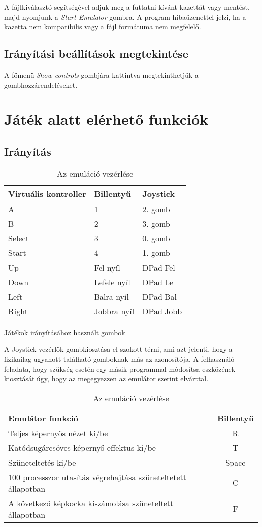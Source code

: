 A fájlkiválasztó segítségével adjuk meg a futtatni kívánt kazettát vagy mentést, majd nyomjunk a \emph{Start Emulator} gombra.
A program hibaüzenettel jelzi, ha a kazetta nem kompatibilis vagy a fájl formátuma nem megfelelő.

\subsection{Irányítási beállítások megtekintése}

A főmenü \emph{Show controls} gombjára kattintva megtekinthetjük a gombhozzárendeléseket.

\section{Játék alatt elérhető funkciók}

\subsection {Irányítás}

\begin{table}[H]
	\centering
	\begin{tabular}{ | l |  l | l | }
		\hline
		Virtuális kontroller & Billentyű & Joystick \\
		\hline			
		A & 1 & 2. gomb \\
		B & 2 & 3. gomb \\
		Select & 3 & 0. gomb \\
		Start & 4 & 1. gomb \\
		Up    & Fel nyíl & DPad Fel \\
		Down  & Lefele nyíl & DPad Le \\
		Left  & Balra nyíl & DPad Bal \\ 
		Right & Jobbra nyíl & DPad Jobb \\
		\hline
	\end{tabular}
	\caption{Játékok irányításához használt gombok}
	
	\begin{flushleft}
		A Joystick vezérlők gombkiosztása el szokott térni, ami azt jelenti, hogy a fizikailag ugyanott található gomboknak más az azonosítója. A felhasználó feladata, hogy szükség esetén egy másik programmal módosítsa eszközének kiosztását úgy, hogy az megegyezzen az emulátor szerint elvárttal.
	\end{flushleft}
	
	\begin{tabular}{ | l | c | }
		\hline
		Emulátor funkció & Billentyű \\
		\hline			
		Teljes képernyős nézet ki/be & R \\
		Katódsugárcsöves képernyő-effektus ki/be & T \\
		Szüneteltetés ki/be & Space \\
		100 processzor utasítás végrehajtása szüneteltetett állapotban & C \\
		A következő képkocka kiszámolása szüneteltett állapotban & F \\
		\hline
	\end{tabular}
	\caption{Az emuláció vezérlése}
\end{table}


